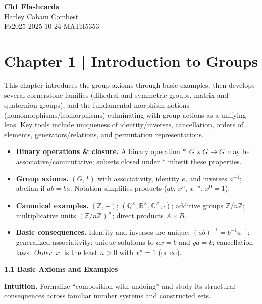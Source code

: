 \documentclass[12pt]{article}
\theoremstyle{definition}
\begin{document}
\begin{center}
\Large\textbf{Ch1 Flashcards} \\
\large Harley Caham Combest \\
\large Fa2025 2025-10-24 MATH5353
\end{center}

\newpage

\newpage

\dotfill
\section*{Chapter 1 | Introduction to Groups}
\dotfill

\newpage

This chapter introduces the group axioms through basic examples, then develops several cornerstone families (dihedral and symmetric groups, matrix and quaternion groups), and the fundamental morphism notions (homomorphisms/isomorphisms) culminating with group actions as a unifying lens. Key tools include uniqueness of identity/inverses, cancellation, orders of elements, generators/relations, and permutation representations.

\begin{itemize}\itemsep4pt
\item \textbf{Binary operations \& closure.} A binary operation $*\!:G\times G\to G$ may be associative/commutative; subsets closed under $*$ inherit these properties.
\item \textbf{Group axioms.} $(G,*)$ with associativity, identity $e$, and inverses $a^{-1}$; abelian if $ab=ba$. Notation simplifies products ($ab$, $x^n$, $x^{-n}$, $x^0=1$).
\item \textbf{Canonical examples.} $(\mathbb{Z},+)$; $(\mathbb{Q}^\times,\mathbb{R}^\times,\mathbb{C}^\times,\cdot)$; additive groups $\mathbb{Z}/n\mathbb{Z}$; multiplicative units $(\mathbb{Z}/n\mathbb{Z})^\times$; direct products $A\times B$.
\item \textbf{Basic consequences.} Identity and inverses are unique; $(ab)^{-1}=b^{-1}a^{-1}$; generalized associativity; unique solutions to $ax=b$ and $ya=b$; cancellation laws. \emph{Order} $|x|$ is the least $n>0$ with $x^n=1$ (or $\infty$).
\end{itemize}

\newpage

\textbf{1.1 Basic Axioms and Examples}

\newpage

\textbf{Intuition.} Formalize “composition with undoing” and study its structural consequences across familiar number systems and constructed sets.
\end{document}

